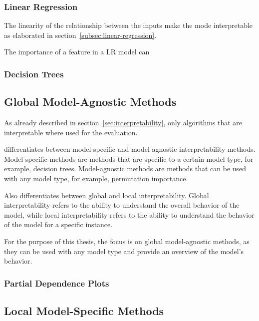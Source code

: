 \subsubsection{Linear Regression}\label{subsubsec:linear-regression}
The linearity of the relationship between the inputs make the mode
interpretable as elaborated in section~\ref{subsec:linear-regression}.

The importance of a feature in a \ac{LR} model can



\subsubsection{Decision Trees}\label{subsubsec:decision-trees}



\subsection*{Global Model-Agnostic Methods}
As already described in section~\ref{sec:interpretability}, only algorithms
that are
interpretable where used for the evaluation.

\cite{molnar2020interpretable} differentiates between
model-specific and model-agnostic interpretability methods.
Model-specific methods are methods that are specific to a certain model type,
for example,
decision trees.
Model-agnostic methods are methods that can be used with any model type, for
example, permutation importance.

Also \cite{molnar2020interpretable} differentiates between global and local
interpretability. Global
interpretability refers to the ability to understand the overall behavior of
the model, while
local interpretability refers to the ability to understand the behavior of
the model for a
specific instance.

For the purpose of this thesis, the focus is on global model-agnostic
methods, as they can be used
with any model type and provide an overview of the model's behavior.

\subsubsection*{Partial Dependence Plots}

\subsection{Local Model-Specific
Methods}\label{subsec:local-model-specific-methods}








